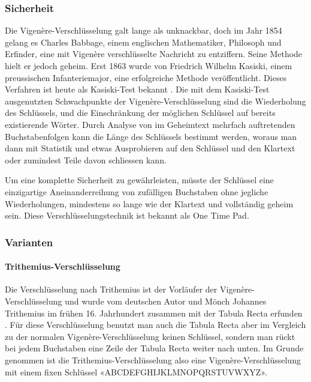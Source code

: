 \subsubsection{Sicherheit}
\label{sec:v-sicherheit}
Die Vigenère-Verschlüsselung galt lange als unknackbar, doch im Jahr 1854 gelang es Charles Babbage, einem englischen Mathematiker, Philosoph und Erfinder, eine mit Vigenère verschlüsselte Nachricht zu entziffern. Seine Methode hielt er jedoch geheim. Erst 1863 wurde von Friedrich Wilhelm Kasiski, einem preussischen Infanteriemajor, eine erfolgreiche Methode veröffentlicht. Dieses Verfahren ist heute als Kasiski-Test bekannt \cite{wikipedia:kasiski_test}. Die mit dem Kasiski-Test ausgenutzten Schwachpunkte der Vigenère-Verschlüsselung sind die Wiederholung des Schlüssels, und die Einschränkung der möglichen Schlüssel auf bereits existierende Wörter. Durch Analyse von im Geheimtext mehrfach auftretenden Buchstabenfolgen kann die Länge des Schlüssels bestimmt werden, woraus man dann mit Statistik und etwas Ausprobieren auf den Schlüssel und den Klartext oder zumindest Teile davon schliessen kann.

Um eine komplette Sicherheit zu gewährleisten, müsste der Schlüssel eine einzigartige Aneinanderreihung von zufälligen Buchstaben ohne jegliche Wiederholungen, mindestens so lange wie der Klartext und vollständig geheim sein. Diese Verschlüsselungstechnik ist bekannt als One Time Pad.


\subsubsection{Varianten}
\label{sec:v-varianten}

\paragraph{Trithemius-Verschlüsselung}
\label{sec:v-trithemius}
Die Verschlüsselung nach Trithemius ist der Vorläufer der Vigenère-Verschlüsselung und wurde vom deutschen Autor und Mönch Johannes Trithemius im frühen 16. Jahrhundert zusammen mit der Tabula Recta erfunden \cite{crypto-it:trithemius}. Für diese Verschlüsselung benutzt man auch die Tabula Recta aber im Vergleich zu der normalen Vigenère-Verschlüsselung keinen Schlüssel, sondern man rückt bei jedem Buchstaben eine Zeile der Tabula Recta weiter nach unten. Im Grunde genommen ist die Trithemius-Verschlüsselung also eine Vigenère-Verschlüsselung mit einem fixen Schlüssel «ABCDEFGHIJKLMNOPQRSTUVWXYZ».

